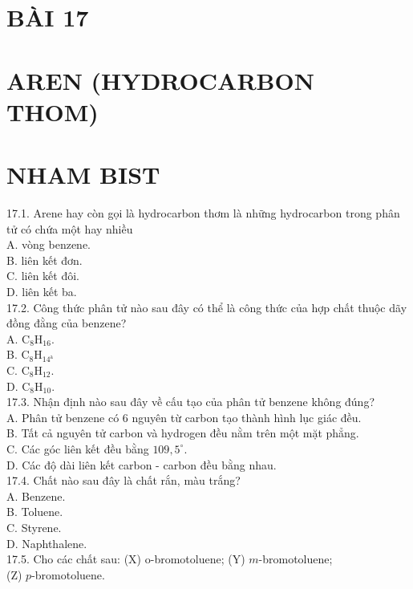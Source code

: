 \documentclass[10pt]{article}
\begin{document}
\section*{BÀI 17}
\section*{AREN (HYDROCARBON THOM)}
\section*{NHAM BIST}
17.1. Arene hay còn gọi là hydrocarbon thơm là những hydrocarbon trong phân tử có chứa một hay nhiều\\
A. vòng benzene.\\
B. liên kết đơn.\\
C. liên kết đôi.\\
D. liên kết ba.\\
17.2. Công thức phân tử nào sau đây có thể là công thức của hợp chất thuộc dãy đồng đằng của benzene?\\
A. $\mathrm{C}_{8} \mathrm{H}_{16}$.\\
B. $\mathrm{C}_{8} \mathrm{H}_{14^{\text {a }}}$\\
C. $\mathrm{C}_{8} \mathrm{H}_{12}$.\\
D. $\mathrm{C}_{8} \mathrm{H}_{10}$.\\
17.3. Nhận định nào sau đây về cấu tạo của phân tử benzene không đúng?\\
A. Phân tử benzene có 6 nguyên từ carbon tạo thành hình lục giác đều.\\
B. Tất cả nguyên tử carbon và hydrogen đều nằm trên một mặt phẳng.\\
C. Các góc liên kết đều bằng $109,5^{\circ}$.\\
D. Các độ dài liên kết carbon - carbon đều bằng nhau.\\
17.4. Chất nào sau đây là chất rắn, màu trắng?\\
A. Benzene.\\
B. Toluene.\\
C. Styrene.\\
D. Naphthalene.\\
17.5. Cho các chất sau: (X) o-bromotoluene; (Y) $m$-bromotoluene;\\
(Z) $p$-bromotoluene.
\end{document}
